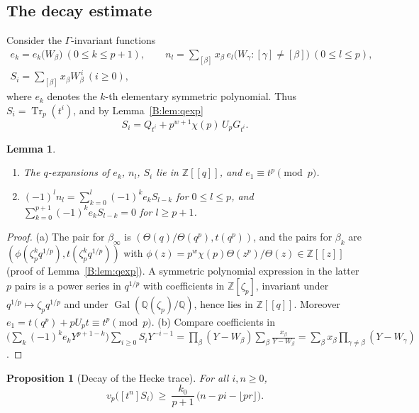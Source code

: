 \documentclass[11pt,a4paper]{article}
\newtheorem{lemma}[theorem]{Lemma}
\newtheorem{proposition}[theorem]{Proposition}
\theoremstyle{definition}\newtheorem{definition}[theorem]{Definition}
\theoremstyle{remark}\newtheorem{remark}[theorem]{Remark}
\newcommand{\Z}{\mathbb Z}
\newcommand{\Q}{\mathbb Q}
\DeclareMathOperator{\Tr}{Tr}
\numberwithin{equation}{section}
\begin{document}
\subsection{The decay estimate}
Consider the $\Gamma$-invariant functions
\begin{gather*}
e_k=e_k\bigl(W_\beta\bigr)\ (0\le k\le p+1),\qquad
n_l=\sum_{[\beta]}x_\beta\,e_l\bigl(W_\gamma:[\gamma]\ne[\beta]\bigr)\ (0\le l\le p),\\
S_i=\sum_{[\beta]}x_\beta W_\beta^{\,i}\ (i\ge0),
\end{gather*}
where $e_k$ denotes the $k$-th elementary symmetric polynomial. Thus $S_i=\Tr_p(t^i)$, and by Lemma~\ref{B:lem:qexp}
\begin{equation}\label{B:eq:Si}
S_i=Q_{t^i}+p^{w+1}\chi(p)\,U_pG_{t^i}.
\end{equation}

\begin{lemma}\label{B:lem:sym}
\begin{enumerate}[label=\textup{(\alph*)}]
\item The $q$-expansions of $e_k$, $n_l$, $S_i$ lie in $\Z[[q]]$, and $e_1\equiv t^p\pmod p$.
\item $(-1)^ln_l=\sum_{k=0}^{l}(-1)^ke_kS_{l-k}$ for $0\le l\le p$, and $\sum_{k=0}^{p+1}(-1)^ke_kS_{l-k}=0$ for $l\ge p+1$.
\end{enumerate}
\end{lemma}

\begin{proof}
(a) The pair for $\beta_\infty$ is $(\Theta(q)/\Theta(q^p),t(q^p))$, and the pairs for $\beta_k$ are
$(\phi(\zeta_p^kq^{1/p}),t(\zeta_p^kq^{1/p}))$ with $\phi(z)=p^w\chi(p)\Theta(z^p)/\Theta(z)\in\Z[[z]]$
(proof of Lemma~\ref{B:lem:qexp}). A symmetric polynomial expression in the latter $p$ pairs is a power series in
$q^{1/p}$ with coefficients in $\Z[\zeta_p]$, invariant under $q^{1/p}\mapsto\zeta_pq^{1/p}$ and under
$\operatorname{Gal}(\Q(\zeta_p)/\Q)$, hence lies in $\Z[[q]]$. Moreover $e_1=t(q^p)+pU_pt\equiv t^p\pmod p$.
(b) Compare coefficients in $\bigl(\sum_k(-1)^ke_kY^{p+1-k}\bigr)\sum_{i\ge0}S_iY^{-i-1}=\prod_\beta(Y-W_\beta)\sum_\beta
\frac{x_\beta}{Y-W_\beta}=\sum_\beta x_\beta\prod_{\gamma\ne\beta}(Y-W_\gamma)$.
\end{proof}

\begin{proposition}[Decay of the Hecke trace]\label{B:prop:decay}
For all $i,n\ge0$,
\[
v_p\bigl([t^n]S_i\bigr)\ \ge\ \frac{k_0}{p+1}\,\bigl(n-pi-\lfloor pr\rfloor\bigr).
\]
\end{proposition}
\end{document}
